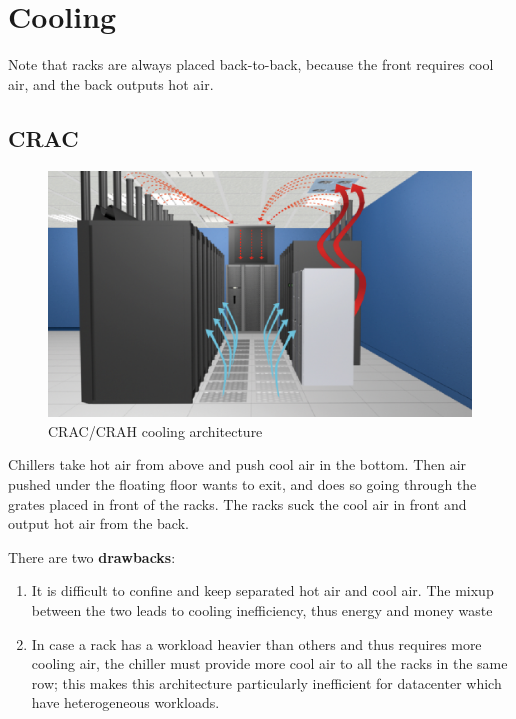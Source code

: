 \section{Cooling}
Note that racks are always placed back-to-back, because the front requires cool air, and the back outputs hot air.
\subsection{CRAC}
\begin{figure}[htbp]
   \centering
   \includegraphics{images/CRAC.jpg}
   \caption{CRAC/CRAH cooling architecture}
   \label{fig:CRAC}
\end{figure}
Chillers take hot air from above and push cool air in the bottom. Then air pushed under the floating floor wants to exit, and does so going through the grates placed in front of the racks.
The racks suck the cool air in front and output hot air from the back.

{
   There are two \textbf{drawbacks}:
   \ns
\begin{enumerate}
   \item It is difficult to confine and keep separated hot air and cool air. The mixup between the two leads to cooling inefficiency, thus energy and money waste
   \item In case a rack has a workload heavier than others and thus requires more cooling air, the chiller must provide more cool air to all the racks in the same row;
   this makes this architecture particularly inefficient for datacenter which have heterogeneous workloads.
\end{enumerate}
}

\newpage
